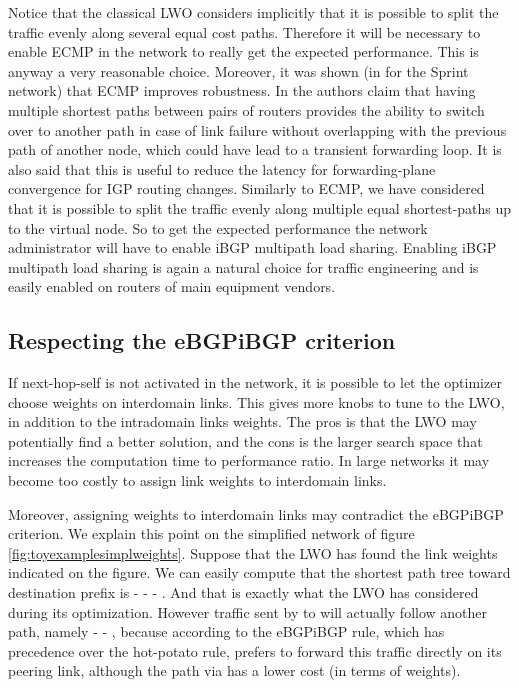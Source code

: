 \documentclass{acm_proc_article-sp}
\begin{document}
Notice that the classical LWO considers implicitly that it is 
possible to split the traffic evenly along several equal cost paths.
Therefore it will be necessary to enable ECMP in the network to really
get the expected performance. This is anyway a very reasonable choice.
Moreover, it was shown (in \cite{diot} for the Sprint network)
that ECMP improves robustness. In \cite{diot2} the authors claim that
having multiple shortest paths between pairs of routers provides the
ability to switch over to another path in case of link failure without
overlapping with the previous path of another node, which could have lead
to a transient forwarding loop. It is also said that this is useful
to reduce the latency for forwarding-plane convergence for IGP
routing changes. Similarly to ECMP, we have considered that it is possible to split the traffic
evenly along multiple equal shortest-paths up to the virtual node.
So to get the expected performance the network administrator will have to enable
iBGP multipath load sharing. 
Enabling iBGP multipath load sharing is again a natural choice for traffic engineering and is
easily enabled on routers of main equipment vendors.

\subsection{Respecting the eBGPiBGP criterion}
\label{sec:ebgpibgp}

If next-hop-self is not activated in the network, it is possible to
let the optimizer choose weights on interdomain links. This gives
more knobs to tune to the LWO, in addition to the intradomain links
weights. The pros is that the LWO may potentially find a better
solution, and the cons is the larger search space that increases the
computation time to performance ratio. In large networks it may become
too costly to assign link weights to interdomain links. 

Moreover, assigning weights to interdomain links may contradict 
the eBGPiBGP criterion. We explain this point on
the simplified network of figure \ref{fig:toyexamplesimplweights}.
Suppose that the LWO has found the
link weights indicated on the figure. We can easily compute that
the shortest path tree toward destination prefix  is  -  -  -
. And that is exactly what the LWO has considered during its optimization.
However traffic sent by  to  will actually follow another path, namely 
 -  - , because according to the eBGPiBGP rule,
which has precedence over the hot-potato rule,
 prefers to forward this traffic directly on 
its peering link, although the path via  has a lower cost (in terms of weights).
\end{document}
